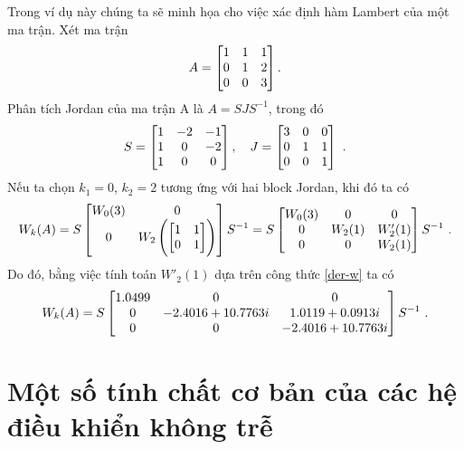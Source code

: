\begin{vd}\label{vd1.1}
Trong ví dụ này chúng ta sẽ minh họa cho việc xác định hàm Lambert của một ma trận. Xét ma trận
%
\[
A = \begin{bmatrix} 1 & 1 & 1 \\ 0 & 1 & 2 \\ 0 &  0  &  3 \end{bmatrix}. 
\]
%
Phân tích Jordan của ma trận A là $A = S J S^{-1}$, trong đó
%
\[
S = \m{ 1 &  -2 & -1 \\ 1 &    0  &  -2 \\ 	1  &   0  &   0 }, \quad J = \m{3 &  0 & 0 \\ 0 &  1 &  1 \\ 0 &  0 & 1} \ .
\]
%
Nếu ta chọn $k_1  = 0$, $k_2 = 2$ tương ứng với hai block Jordan, khi đó ta có 
%
\[
W_k(A) = S \begin{bmatrix} W_0(3) & 0  \\ 0  & W_2\left( \begin{bmatrix} 1 &  1 \\ 0 &  1 \end{bmatrix} \right)  \end{bmatrix} S^{-1} 
 = S \begin{bmatrix} W_0(3) & 0 & 0 \\ 0  & W_2(1) & W'_2(1) \\  0 & 0  & W_2(1) \end{bmatrix} S^{-1} \ .
\]
%
Do đó, bằng việc tính toán $ W'_2(1) $ dựa trên công thức \eqref{der-w} ta có
%
\[
W_k(A) = S \begin{bmatrix} 1.0499 & 0 & 0 \\ 0 & -2.4016 +10.7763i &  1.0119 + 0.0913i \\ 0 & 0 & -2.4016 +10.7763i \end{bmatrix} S^{-1} \ .
\]
%
\end{vd}

\section{Một số tính chất cơ bản của các hệ điều khiển không trễ}\label{sec1.2}

